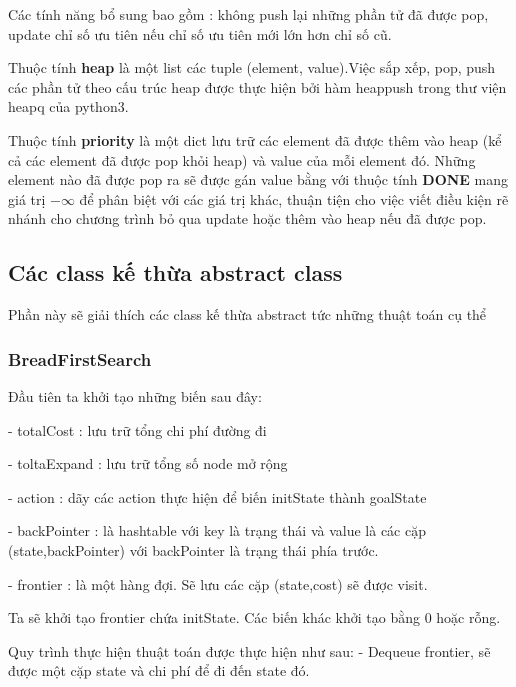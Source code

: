 \documentclass[11pt]{scrartcl} %
\begin{document}
Các tính năng bổ sung bao gồm : không push lại những phần tử đã được pop, update chỉ số ưu tiên nếu chỉ số ưu tiên mới lớn hơn chỉ số cũ. 


Thuộc tính \textbf{heap} là một list các tuple (element, value).Việc sắp xếp, pop, push các phần tử theo cấu trúc heap được thực hiện bởi hàm heappush trong thư viện heapq của python3.

Thuộc tính \textbf{priority} là một dict lưu trữ các element đã được thêm vào heap (kể cả các element đã được pop khỏi heap) và value của mỗi element đó. Những element nào đã được pop ra sẽ được gán value bằng với thuộc tính \textbf{DONE} mang giá trị $- \infty$ để phân biệt với các giá trị khác, thuận tiện cho việc viết điều kiện rẽ nhánh cho chương trình bỏ qua update hoặc thêm vào heap nếu đã được pop.
\subsection{Các class kế thừa abstract class}
Phần này sẽ giải thích các class kế thừa abstract tức những thuật toán cụ thể
\subsubsection{BreadFirstSearch}
Đầu tiên ta khởi tạo những biến sau đây:  

- totalCost : lưu trữ tổng chi phí đường đi  

- toltaExpand : lưu trữ tổng số node mở rộng  

- action : dãy các action thực hiện để biến initState thành goalState  

- backPointer : là hashtable với key là trạng thái và value là các cặp (state,backPointer) với backPointer là trạng thái phía trước.  

- frontier : là một hàng đợi. Sẽ lưu các cặp (state,cost) sẽ được visit.  

Ta sẽ khởi tạo frontier chứa initState. Các biến khác khởi tạo bằng 0 hoặc rỗng.  

Quy trình thực hiện thuật toán được thực hiện như sau:
- Dequeue frontier, sẽ được một cặp state và chi phí để đi đến state đó.
\end{document}
